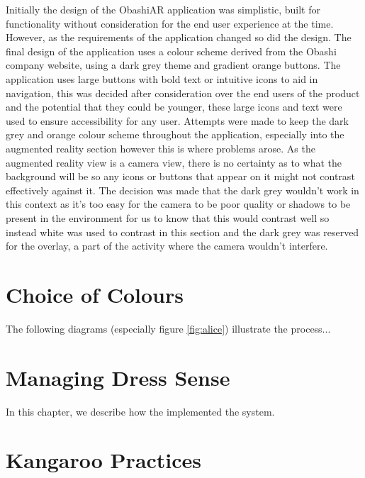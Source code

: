 \documentclass{l3proj}
\begin{document}
Initially the design of the ObashiAR application was simplistic, built for functionality without consideration for the end user experience at the time. However, as the requirements of the application changed so did the design. The final design of the application uses a colour scheme derived from the Obashi company website\cite{ObashiWebsite}, using a dark grey theme and gradient orange buttons. The application uses large buttons with bold text or intuitive icons to aid in navigation, this was decided after consideration over the end users of the product and the potential that they could be younger, these large icons and text were used to ensure accessibility for any user. Attempts were made to keep the dark grey and orange colour scheme throughout the application, especially into the augmented reality section however this is where problems arose. As the augmented reality view is a camera view, there is no certainty as to what the background will be so any icons or buttons that appear on it might not contrast effectively against it. The decision was made that the dark grey wouldn’t work in this context as it’s too easy for the camera to be poor quality or shadows to be present in the environment for us to know that this would contrast well so instead white was used to contrast in this section and the dark grey was reserved for the overlay, a part of the activity where the camera wouldn’t interfere. 




\section{Choice of Colours}
\label{design}

The following diagrams (especially figure \ref{fig:alice}) illustrate the
process...

\section{Managing Dress Sense}
\label{managing}

In this chapter, we describe how the implemented the system.

\section{Kangaroo Practices}
\end{document}
